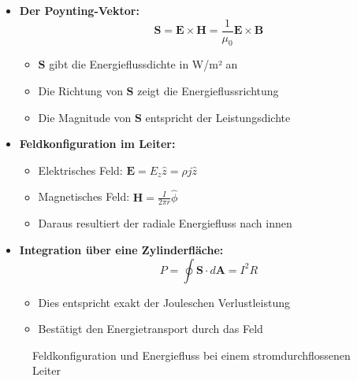 \documentclass[12pt,a4paper]{article}
\begin{document}
\begin{itemize}
    \item \textbf{Der Poynting-Vektor:}
    \[ \mathbf{S} = \mathbf{E} \times \mathbf{H} = \frac{1}{\mu_0} \mathbf{E} \times \mathbf{B} \]
    \begin{itemize}
        \item \( \mathbf{S} \) gibt die Energieflussdichte in W/m² an
        \item Die Richtung von \( \mathbf{S} \) zeigt die Energieflussrichtung
        \item Die Magnitude von \( \mathbf{S} \) entspricht der Leistungsdichte
    \end{itemize}

    \item \textbf{Feldkonfiguration im Leiter:}
    \begin{itemize}
        \item Elektrisches Feld: \( \mathbf{E} = E_z \hat{z} = \rho j \hat{z} \)
        \item Magnetisches Feld: \( \mathbf{H} = \frac{I}{2\pi r} \hat{\phi} \)
        \item Daraus resultiert der radiale Energiefluss nach innen
    \end{itemize}

    \item \textbf{Integration über eine Zylinderfläche:}
    \[ P = \oint \mathbf{S} \cdot d\mathbf{A} = I^2R \]
    \begin{itemize}
        \item Dies entspricht exakt der Jouleschen Verlustleistung
        \item Bestätigt den Energietransport durch das Feld
    \end{itemize}
\end{itemize}

\begin{figure}[h]
\centering
{}
\caption{Feldkonfiguration und Energiefluss bei einem stromdurchflossenen Leiter}
\end{figure}
\end{document}
